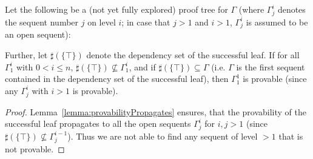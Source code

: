 \documentclass{llncs}
\begin{document}




\begin{lemma}
Let the following be a (not yet fully explored) proof tree for $\Gamma$ (where $\Gamma^i_j$ denotes
the sequent number $j$ on level $i$; in case that $j>1$ and $i>1$, $\Gamma^i_j$ is assumed to be an
open sequent):
\begin{quote}
\centerline{}
\end{quote}
Further, let $\sharp(\{\top\})$ denote the dependency set of the successful leaf. If for all $\Gamma^i_1$
with $0<i\leq n$, $\sharp(\{\top\})\not\subseteq\Gamma^i_1$,
and if $\sharp(\{\top\})\subseteq\Gamma$ (i.e. $\Gamma$ is the first sequent contained in the dependency
set of the successful leaf), then $\Gamma^1_1$ is provable (since any $\Gamma^i_j$ with $i>1$ is provable).

\begin{proof}
Lemma~\ref{lemma:provabilityPropagates} ensures, that the provability of the successful leaf
propagates to all the open sequents $\Gamma^i_j$ for $i,j>1$ (since $\sharp(\{\top\})\not\subseteq\Gamma^{i-1}_j$).
Thus we are not able to find any sequent of level $>1$ that is not provable.

\end{proof}
\end{lemma}
\end{document}
